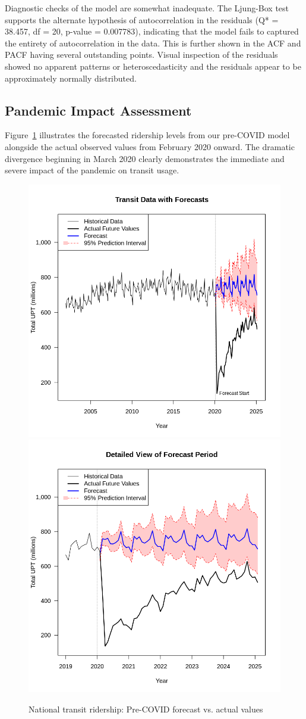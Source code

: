 \documentclass[11pt]{article}
\begin{document}
Diagnostic checks of the model are somewhat inadequate. The Ljung-Box test supports the alternate hypothesis of autocorrelation in the residuals (Q* = 38.457, df = 20, p-value = 0.007783), indicating that the model fails to captured the entirety of autocorrelation in the data. This is further shown in the ACF and PACF having several outstanding points. Visual inspection of the residuals showed no apparent patterns or heteroscedasticity and the residuals appear to be approximately normally distributed.

\subsection{Pandemic Impact Assessment}

Figure~\ref{f:forecast} illustrates the forecasted ridership levels from our pre-COVID model alongside the actual observed values from February 2020 onward. The dramatic divergence beginning in March 2020 clearly demonstrates the immediate and severe impact of the pandemic on transit usage.

\begin{figure}[!ht]
\centering
\includegraphics[width=0.485\linewidth]{pre_forecast.png}
\includegraphics[width=0.485\linewidth]{pre_forecast_close.png}
\caption{National transit ridership: Pre-COVID forecast vs. actual values}
\label{f:forecast}
\end{figure}
\end{document}
